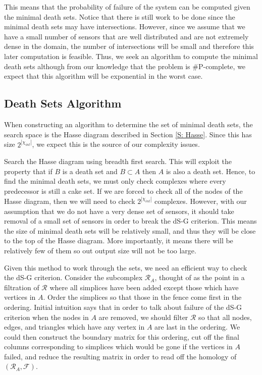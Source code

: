 \documentclass[10pt,twocolumn]{article} \usepackage{amsmath,epsf,amssymb,cite,pifont,amsthm, mathrsfs,epsfig,  bbm, amsthm,  setspace}
\newcommand{\FF}{\mathcal F}
\newcommand{\RR}{\mathcal R}
\renewcommand{\1}{\mathbbm{1}}
\begin{document}
This means that the probability of failure of the system can be computed given the minimal death sets.
Notice that there is still work to be done since the minimal death sets may have intersections.
However, since we assume that we have a small number of sensors that are well distributed
and are not extremely dense in the domain,
the number of intersections will be small and therefore this later computation is feasible.
Thus, we seek an algorithm to compute the minimal death sets
although from our knowledge that the problem is \#P-complete,
we expect that this algorithm will be exponential in the worst case.


\subsection{Death Sets Algorithm}\label{S: Death Sets Algorithm}

When constructing an algorithm to determine the set of minimal death sets, the search space is the Hasse diagram described in Section \ref{S: Hasse}.
Since this has size $2^{|\chi_{int}|}$, we expect this is the source of our complexity issues.

Search the Hasse diagram using breadth first search.
This will exploit the property that if $B$ is a death set and $B \subset A$ then $A$ is also a death set.
Hence, to find the minimal death sets, we must only check complexes where every predecessor is still a cake set.
If we are forced to check all of the nodes of the Hasse diagram, then we will need to check $2^{|\chi_{int}|}$ complexes.
However, with our assumption that we do not have a very dense set of sensors, it should take removal of a small set of sensors in order to break the dS-G criterion.
This means the size of minimal death sets will be relatively small, and thus they will be close to the top of the Hasse diagram.
More importantly, it means there will be relatively few of them so out output size will not be too large.

Given this method to work through the sets, we need an efficient way
to check the dS-G criterion.
Consider the subcomplex $\RR_A$, thought of as the point in a filtration of
$\RR$ where all simplices have been added except those which have vertices in $A$.
Order the simplices so that those in the fence come first in the ordering.
Initial intuition says that in order to talk about failure of the dS-G criterion when the nodes in $A$ are removed,
we should filter $\RR$ so that all nodes, edges,
and triangles which have any vertex in $A$ are last in the ordering.
We could then construct the boundary matrix for this ordering,
cut off the final columns corresponding to simplices which would be gone if the vertices in $A$ failed,
and reduce the resulting matrix in order to read off the homology of $(\RR_A,\FF)$.
\end{document}

